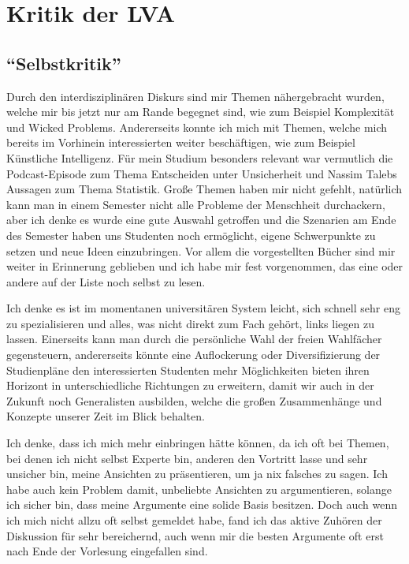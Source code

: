 \documentclass[twoside, a4paper, DIV=11, open=any, bibliography=totoc]{scrbook}
\newcommand{\Quote}[1]{\glqq #1\grqq{}}
\begin{document}
\chapter{Kritik der LVA} \label{chap:lvakritik}

\section{"`Selbstkritik"'}

Durch den interdisziplinären Diskurs sind mir Themen nähergebracht wurden,
welche mir bis jetzt nur am Rande begegnet sind, wie zum Beispiel Komplexität
und \Quote{Wicked Problems}. Andererseits konnte ich mich mit Themen,
welche mich bereits im Vorhinein interessierten weiter beschäftigen, wie zum Beispiel
Künstliche Intelligenz. 
Für mein Studium besonders relevant war vermutlich die Podcast-Episode zum Thema
Entscheiden unter Unsicherheit und Nassim Talebs Aussagen zum Thema Statistik.
Große Themen haben mir nicht gefehlt, natürlich kann man in einem Semester nicht
alle Probleme der Menschheit durchackern, aber ich denke es wurde eine gute Auswahl getroffen
und die Szenarien am Ende des Semester haben uns Studenten noch ermöglicht,
eigene Schwerpunkte zu setzen und neue Ideen einzubringen.
Vor allem die vorgestellten Bücher sind mir weiter in Erinnerung geblieben und
ich habe mir fest vorgenommen, das eine oder andere auf der Liste noch selbst zu lesen.


Ich denke es ist im momentanen universitären System leicht,
sich schnell sehr eng zu spezialisieren und alles, was nicht direkt zum Fach gehört, links liegen zu lassen.
Einerseits kann man durch die persönliche Wahl der freien Wahlfächer gegensteuern,
andererseits könnte eine Auflockerung oder Diversifizierung der Studienpläne
den interessierten Studenten mehr Möglichkeiten bieten ihren Horizont
in unterschiedliche Richtungen zu erweitern, damit wir auch in der Zukunft
noch Generalisten ausbilden, welche die großen Zusammenhänge und Konzepte
unserer Zeit im Blick behalten.


Ich denke, dass ich mich mehr einbringen hätte können, da ich oft bei
Themen, bei denen ich nicht selbst Experte bin, anderen den Vortritt lasse
und sehr unsicher bin, meine Ansichten zu präsentieren, um ja nix falsches zu sagen.
Ich habe auch kein Problem damit, unbeliebte Ansichten zu argumentieren, solange
ich sicher bin, dass meine Argumente eine solide Basis besitzen.
Doch auch wenn ich mich nicht allzu oft selbst gemeldet habe, fand ich das
aktive Zuhören der Diskussion für sehr bereichernd, auch wenn mir die besten
Argumente oft erst nach Ende der Vorlesung eingefallen sind.
\end{document}
